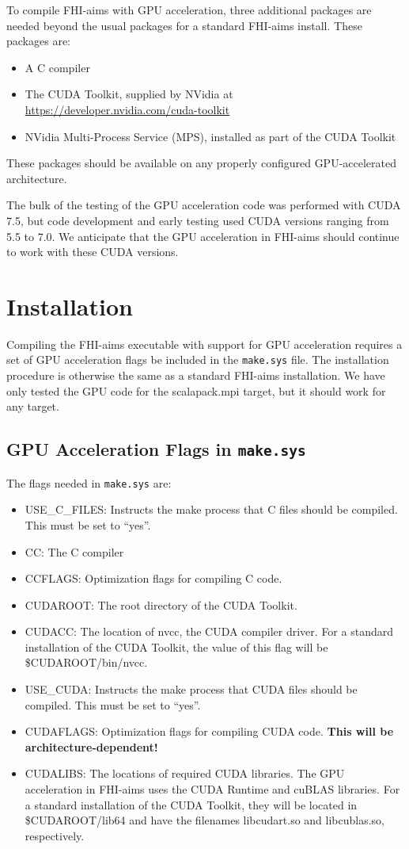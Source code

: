 To compile FHI-aims with GPU acceleration, three additional packages are needed beyond the usual packages for a standard FHI-aims install.  These packages are:
\begin{itemize}
	\item A C compiler
	\item The CUDA Toolkit, supplied by NVidia at \url{https://developer.nvidia.com/cuda-toolkit}
	\item NVidia Multi-Process Service (MPS), installed as part of the CUDA Toolkit
\end{itemize}
These packages should be available on any properly configured GPU-accelerated architecture.

The bulk of the testing of the GPU acceleration code was performed with CUDA 7.5, but code development and early testing used CUDA versions ranging from 5.5 to 7.0.  We anticipate that the GPU acceleration in FHI-aims should continue to work with these CUDA versions.

\section{Installation}
Compiling the FHI-aims executable with support for GPU acceleration requires a set of GPU acceleration flags be included in the \texttt{make.sys} file.  The installation procedure is otherwise the same as a standard FHI-aims installation.  We have only tested the GPU code for the scalapack.mpi target, but it should work for any target.

\subsection{GPU Acceleration Flags in \texttt{make.sys}}

The flags needed in \texttt{make.sys} are:
\begin{itemize}
	\item USE\_C\_FILES: Instructs the make process that C files should be compiled.  This must be set to ``yes''. 
	\item CC: The C compiler
	\item CCFLAGS: Optimization flags for compiling C code.
	\item CUDAROOT: The root directory of the CUDA Toolkit.
	\item CUDACC: The location of nvcc, the CUDA compiler driver.  For a standard installation of the CUDA Toolkit, the value of this flag will be \$CUDAROOT/bin/nvcc.
	\item USE\_CUDA: Instructs the make process that CUDA files should be compiled.  This must be set to ``yes''.
	\item CUDAFLAGS:   Optimization flags for compiling CUDA code.  \textbf{This will be architecture-dependent!}
	\item CUDALIBS:    The locations of required CUDA libraries.  The GPU acceleration in FHI-aims uses the CUDA Runtime and cuBLAS libraries.  For a standard installation of the CUDA Toolkit, they will be located in \$CUDAROOT/lib64 and have the filenames libcudart.so and libcublas.so, respectively.
\end{itemize}

